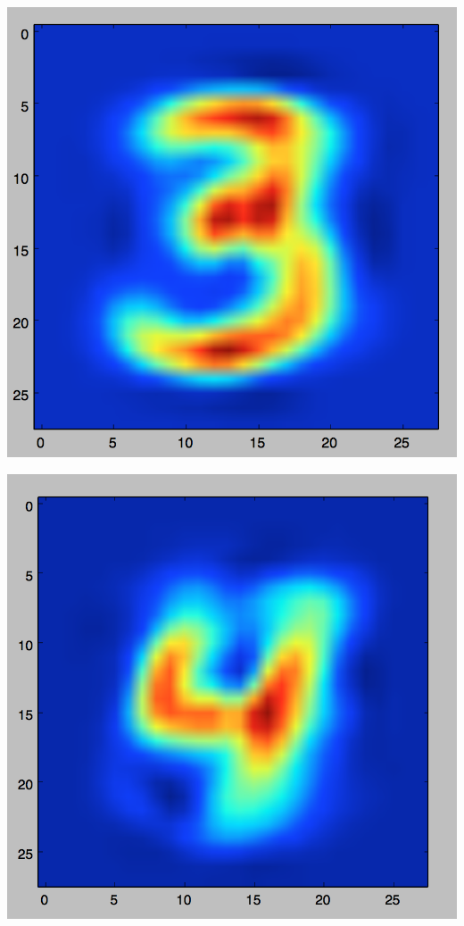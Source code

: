 \documentclass[11pt]{article}
\begin{document}
\includegraphics[scale=.3]{images/bayes3.png}

\includegraphics[scale=.3]{images/bayes4.png}
\end{document}
